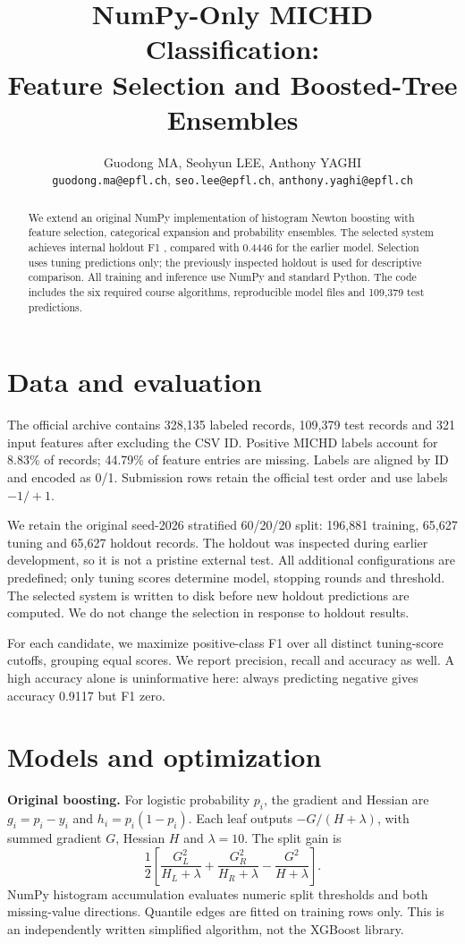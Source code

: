 \documentclass[10pt,conference,compsocconf]{IEEEtran}
\begin{document}
\title{NumPy-Only MICHD Classification:\\Feature Selection and Boosted-Tree Ensembles}
\author{Guodong MA, Seohyun LEE, Anthony YAGHI\\
\texttt{guodong.ma@epfl.ch}, \texttt{seo.lee@epfl.ch}, \texttt{anthony.yaghi@epfl.ch}}
\maketitle
\begin{abstract}
We extend an original NumPy implementation of histogram Newton boosting with feature selection, categorical expansion and probability ensembles. The selected system achieves internal holdout F1 \NewF{}, compared with 0.4446 for the earlier model. Selection uses tuning predictions only; the previously inspected holdout is used for descriptive comparison. All training and inference use NumPy and standard Python. The code includes the six required course algorithms, reproducible model files and 109,379 test predictions.
\end{abstract}
\section{Data and evaluation}
The official archive contains 328,135 labeled records, 109,379 test records and 321 input features after excluding the CSV ID. Positive MICHD labels account for 8.83\% of records; 44.79\% of feature entries are missing. Labels are aligned by ID and encoded as 0/1. Submission rows retain the official test order and use labels $-1/+1$.

We retain the original seed-2026 stratified 60/20/20 split: 196,881 training, 65,627 tuning and 65,627 holdout records. The holdout was inspected during earlier development, so it is not a pristine external test. All additional configurations are predefined; only tuning scores determine model, stopping rounds and threshold. The selected system is written to disk before new holdout predictions are computed. We do not change the selection in response to holdout results.

For each candidate, we maximize positive-class F1 over all distinct tuning-score cutoffs, grouping equal scores. We report precision, recall and accuracy as well. A high accuracy alone is uninformative here: always predicting negative gives accuracy 0.9117 but F1 zero.

\section{Models and optimization}
\textbf{Original boosting.} For logistic probability $p_i$, the gradient and Hessian are $g_i=p_i-y_i$ and $h_i=p_i(1-p_i)$. Each leaf outputs $-G/(H+\lambda)$, with summed gradient $G$, Hessian $H$ and $\lambda=10$. The split gain is
\[
\frac12\left[\frac{G_L^2}{H_L+\lambda}
+\frac{G_R^2}{H_R+\lambda}
-\frac{G^2}{H+\lambda}\right].
\]
NumPy histogram accumulation evaluates numeric split thresholds and both missing-value directions. Quantile edges are fitted on training rows only. This is an independently written simplified algorithm, not the XGBoost library.
\end{document}
